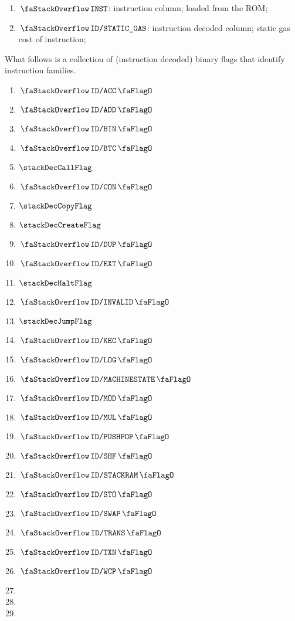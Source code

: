 \begin{enumerate}[resume]
	\item $\stackInst$:
		instruction column; loaded from the ROM;
	\item $\stackStaticGas$:
		instruction decoded column;
		static gas cost of instruction;
\end{enumerate}
What follows is a collection of (instruction decoded) binary flags that identify instruction families.
\begin{multicols}{4}
	\begin{enumerate}[resume]
		\item $\stackDecAccFlag$
		\item $\stackDecAddFlag$
		\item $\stackDecBinFlag$
		\item $\stackDecBtcFlag$
		\item $\stackDecCallFlag$
		\item $\stackDecConFlag$
		\item $\stackDecCopyFlag$
		\item $\stackDecCreateFlag$
		\item $\stackDecDupFlag$
		\item $\stackDecExtFlag$
		\item $\stackDecHaltFlag$
		\item $\stackDecInvalidFlag$
		\item $\stackDecJumpFlag$
		\item $\stackDecKecFlag$
		\item $\stackDecLogFlag$
		\item $\stackDecMachineStateFlag$
		\item $\stackDecModFlag$
		\item $\stackDecMulFlag$
		\item $\stackDecPushPopFlag$
		\item $\stackDecShfFlag$
		\item $\stackDecStackRamFlag$
		\item $\stackDecStoFlag$
		\item $\stackDecSwapFlag$
		\item $\stackDecTransFlag$
		\item $\stackDecTxnFlag$
		\item $\stackDecWcpFlag$
		\item[\vspace{\fill}]
		\item[\vspace{\fill}]
		\item[\vspace{\fill}]
	\end{enumerate}
\end{multicols}
